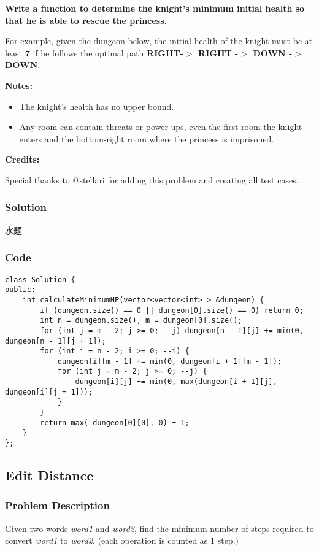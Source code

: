 \documentclass[courier]{article}
\begin{document}
\begin{CJK*}{UTF8}{gkai}
\textbf{Write a function to determine the knight's minimum initial health so that he is able to rescue the princess.}

For example, given the dungeon below, the initial health of the knight must be at least \textbf{7} if he follows the optimal path \textbf{RIGHT-$>$ RIGHT -$>$ DOWN -$>$ DOWN}.

\textbf{Notes:}

\begin{itemize}
\item The knight's health has no upper bound.
\item Any room can contain threats or power-ups, even the first room the knight enters and the bottom-right room where the princess is imprisoned.  
\end{itemize}

\textbf{Credits:}

Special thanks to @stellari for adding this problem and creating all test cases.



\subsubsection*{Solution}
水题

\subsubsection*{Code}
\begin{lstlisting}
class Solution {
public:
    int calculateMinimumHP(vector<vector<int> > &dungeon) {
        if (dungeon.size() == 0 || dungeon[0].size() == 0) return 0;
        int n = dungeon.size(), m = dungeon[0].size();
        for (int j = m - 2; j >= 0; --j) dungeon[n - 1][j] += min(0, dungeon[n - 1][j + 1]);
        for (int i = n - 2; i >= 0; --i) {
            dungeon[i][m - 1] += min(0, dungeon[i + 1][m - 1]);
            for (int j = m - 2; j >= 0; --j) {
                dungeon[i][j] += min(0, max(dungeon[i + 1][j], dungeon[i][j + 1]));
            }
        }
        return max(-dungeon[0][0], 0) + 1;
    }
}; 
\end{lstlisting}


\subsection{ Edit Distance }

\subsubsection*{Problem Description}
Given two words \emph{word1} and \emph{word2}, find the minimum number of steps required to convert \emph{word1} to \emph{word2}. (each operation is counted as 1 step.)


\end{CJK*}
\end{document}
